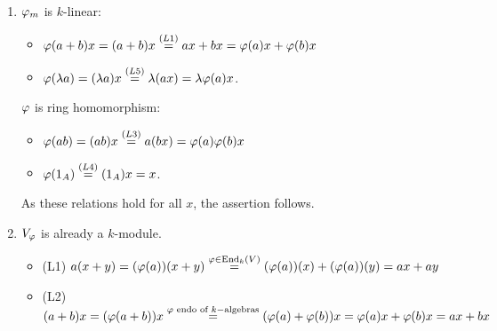 \begin{sol}
  \begin{enumerate}
    \item $\varphi_m$ is $k$-linear:
    \begin{itemize}
      \item $\varphi(a+b)x=(a+b)x\overset{(L1)}{=}ax+bx=\varphi(a)x+\varphi(b)x$
      \item $\varphi(\lambda a)=(\lambda a)x\overset{(L5)}{=}\lambda(ax)=\lambda\varphi(a)x$.
    \end{itemize}
    $\varphi$ is ring homomorphism:
    \begin{itemize}
      \item $\varphi(ab)=(ab)x\overset{(L3)}{=}a(bx)=\varphi(a)\varphi(b)x$
      \item $\varphi(1_A)\overset{(L4)}{=}(1_A)x=x$.
    \end{itemize}
    As these relations hold for all $x$, the assertion follows.
    \item $V_{\varphi}$ is already a $k$-module.
    \begin{itemize}
      \item (L1) $a(x+y)=(\varphi(a))(x+y)\overset{\varphi \in \operatorname{End}_k(V)}{=}(\varphi(a))(x)+(\varphi(a))(y) = ax+ay$
      \item (L2) $(a+b)x=(\varphi(a+b))x\overset{\varphi\text{ endo of } k-\text{algebras}}{=}(\varphi(a)+\varphi(b))x=\varphi(a)x+\varphi(b)x=ax+bx$
    \end{itemize}
  \end{enumerate}
\end{sol}

